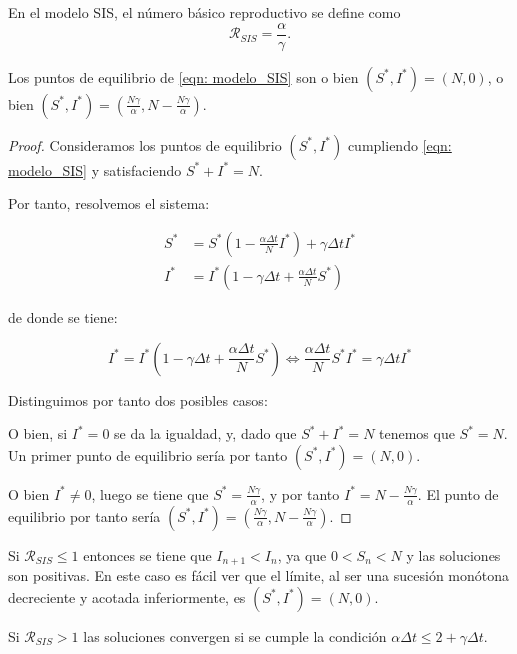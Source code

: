 En el modelo SIS, el número básico reproductivo se define como 
$$\mathcal{R}_{SIS}=\frac{\alpha}{\gamma}.$$

\begin{lemma}
Los puntos de equilibrio de \eqref{eqn: modelo_SIS} son o bien $(S^*,I^*)=(N,0)$, o bien $(S^*,I^*)=(\frac{N\gamma}{\alpha}, N-\frac{N\gamma}{\alpha})$.
\end{lemma}

\begin{proof}
Consideramos los puntos de equilibrio $(S^*, I^*)$ cumpliendo \eqref{eqn: modelo_SIS} y satisfaciendo $S^*+I^*=N$.

Por tanto, resolvemos el sistema:

\begin{equation}
\begin{aligned}
S^* & = S^* \left(1-\frac{\alpha\Delta t}{N} I^* \right) + \gamma \Delta t I^* \\
I^* & = I^* \left( 1-\gamma \Delta t + \frac{\alpha\Delta t}{N} S^* \right)
\end{aligned}
\end{equation}

de donde se tiene:

$$I^* = I^* \left( 1-\gamma \Delta t + \frac{\alpha\Delta t}{N} S^* \right) \Leftrightarrow \frac{\alpha\Delta t}{N} S^*I^* = \gamma\Delta t I^*$$

Distinguimos por tanto dos posibles casos:

O bien, si $I^*=0$ se da la igualdad, y, dado que $S^*+I^*=N$ tenemos que $S^*=N$. Un primer punto de equilibrio sería por tanto $(S^*,I^*)=(N,0)$.

O bien $I^*\neq 0$, luego se tiene que $S^*=\frac{N\gamma}{\alpha}$, y por tanto $I^*=N-\frac{N\gamma}{\alpha}$. El punto de equilibrio por tanto sería $(S^*,I^*)=(\frac{N\gamma}{\alpha}, N-\frac{N\gamma}{\alpha})$.


\end{proof}


\begin{lemma}
Si $\mathcal{R}_{SIS}\leq 1$ entonces se tiene que $I_{n+1} < I_n$, ya que $0<S_n<N$ y las soluciones son positivas. En este caso es fácil ver que el límite, al ser una sucesión monótona decreciente y acotada inferiormente, es $(S^*,I^*)=(N,0)$.

Si $\mathcal{R}_{SIS}>1$ las soluciones convergen si se cumple la condición $\alpha \Delta t \leq 2+\gamma \Delta t$.
\end{lemma}

